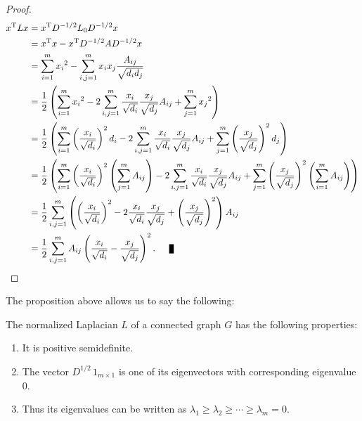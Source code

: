 \begin{proof}
   \begin{equation*} 
      \begin{split}
         x^{\rm T}Lx &= x^{\rm T} D ^{-1/2} L_0 D^{-1/2} x \\
         &= x^{\rm T}x - x^{\rm T}D^{-1/2}AD^{-1/2}x \\
         &= \sum_{i=1}^m {x_i}^2 - \sum_{i,j = 1}^m x_i  x_j \frac{A_{ij}}{\sqrt{d_i d_j}}  \\
         &= \frac{1}{2} \left( \sum_{i=1}^m {x_i}^2 - 2\sum_{i,j = 1}^m \frac{x_i}{\sqrt{d_i}} \frac{x_j}{\sqrt{d_j}} A_{ij} + \sum_{j=1}^m {x_j}^2 \right) \\
         &= \frac{1}{2} \left( \sum_{i=1}^m \left( \frac{x_i}{\sqrt{d_i}} \right) ^2 d_i - 2\sum_{i,j = 1}^m \frac{x_i}{\sqrt{d_i}} \frac{x_j}{\sqrt{d_j}} A_{ij} +  \sum_{j=1}^m \left( \frac{x_j}{\sqrt{d_j}} \right) ^2 d_j \right) \\
         &= \frac{1}{2} \left( \sum_{i=1}^m \left( \frac{x_i}{\sqrt{d_i}} \right) ^2 \left( \sum_{j=1}^m A_{ij} \right) - 2\sum_{i,j = 1}^m \frac{x_i}{\sqrt{d_i}} \frac{x_j}{\sqrt{d_j}} A_{ij} +  \sum_{j=1}^m \left( \frac{x_j}{\sqrt{d_j}} \right) ^2 \left( \sum_{i=1}^m A_{ij} \right) \right) \\
         &= \frac{1}{2} \sum_{i,j=1}^m \left( \left( \frac{x_i}{\sqrt{d_i}} \right)^2 - 2\frac{x_i}{\sqrt{d_i}}\frac{x_j}{\sqrt{d_j}} + \left( \frac{x_j}{\sqrt{d_j}} \right) ^2 \right) A_{ij} \\
         &= \frac{1}{2} \sum_{i,j=1}^m A_{ij} \left( \frac{x_i}{\sqrt{d_i}}- \frac{x_j}{\sqrt{d_j}} \right)^2. \qed
      \end{split}
   \end{equation*}
\end{proof}

The proposition above allows us to say the following:

\begin{corollary}
   The normalized Laplacian $L$ of a connected graph $G$ has the following properties:
   \begin{enumerate}
      \item It is positive semidefinite.
      \item The vector $D^{1/2} \, 1_{m \times 1}$ is one of its eigenvectors with corresponding eigenvalue $0$.
      \item Thus its eigenvalues can be written as $\lambda_1 \ge \lambda_2 \ge \cdots \ge \lambda_m = 0$.
   \end{enumerate}
\end{corollary}

